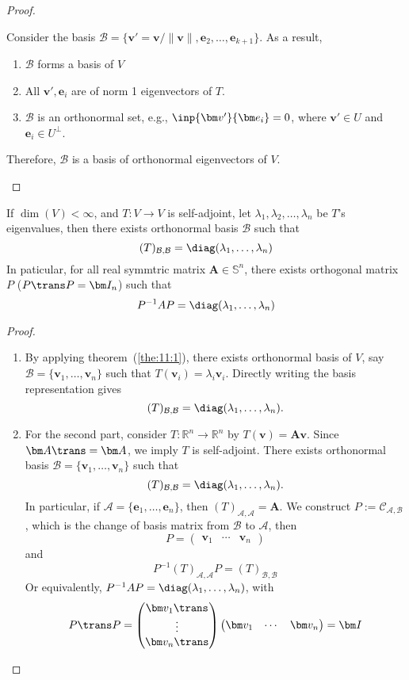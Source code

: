 \begin{proof}
\begin{itemize}
Consider the basis $\mathcal{B}=\{\bm v'=\bm v/\|\bm v\|,\bm e_2,\dots,\bm e_{k+1}\}$. As a result,
\begin{enumerate}
\item
$\mathcal{B}$ forms a basis of $V$
\item
All $\bm v',\bm e_i$ are of norm 1 eigenvectors of $T$.
\item
$\mathcal{B}$ is an orthonormal set, e.g., $\inp{\bm v'}{\bm e_i}=0$, where $\bm v'\in U$ and $\bm e_i\in U^\perp$.
\end{enumerate}
Therefore, $\mathcal{B}$ is a basis of orthonormal eigenvectors of $V$.
\end{itemize}
\end{proof}

\begin{corollary}
If $\dim(V)<\infty$, and $T:V\to V$ is self-adjoint, let $\lambda_1, \lambda_2,\dots,\lambda_n$ be $T$'s eigenvalues, then there exists orthonormal basis $\mathcal{B}$ such that
\[
(T)_{\mathcal{B},\mathcal{B}}=\diag(\lambda_1,\dots,\lambda_n)
\]
In paticular, for all real symmtric matrix $\bm A\in\mathbb{S}^n$, there exists orthogonal matrix $P$ ($P\trans P=\bm I_n$) such that
\[
P^{-1}AP=\diag(\lambda_1,\dots,\lambda_n)
\]
\end{corollary}
\begin{proof}
\begin{enumerate}
\item
By applying theorem~(\ref{the:11:1}), there exists orthonormal basis of $V$, say $\mathcal{B}=\{\bm v_1,\dots,\bm v_n\}$ such that $T(\bm v_i)=\lambda_i\bm v_i$. Directly writing the basis representation gives
\[
(T)_{\mathcal{B},\mathcal{B}}=\diag(\lambda_1,\dots,\lambda_n).
\]
\item
For the second part, consider $T:\mathbb{R}^n\to\mathbb{R}^n$ by $T(\bm v)=\bm A\bm v$.
Since $\bm A\trans=\bm A$, we imply $T$ is self-adjoint.
There exists orthonormal basis $\mathcal{B}=\{\bm v_1,\dots,\bm v_n\}$ such that
\[
(T)_{\mathcal{B},\mathcal{B}}=\diag(\lambda_1,\dots,\lambda_n).
\]
In particular, if $\mathcal{A}=\{\bm e_1,\dots,\bm e_n\}$, then $(T)_{\mathcal{A},\mathcal{A}}=\bm A$.
We construct $P:=\mathcal{C}_{\mathcal{A},\mathcal{B}}$, which is the change of basis matrix from $\mathcal{B}$ to $\mathcal{A}$, then
\[
P=\begin{pmatrix}
\bm v_1&\cdots&\bm v_n
\end{pmatrix}
\]
and 
\[
P^{-1}(T)_{\mathcal{A},\mathcal{A}}P=(T)_{\mathcal{B},\mathcal{B}}
\]
Or equivalently, $P^{-1}AP=\diag(\lambda_1,\dots,\lambda_n)$, with 
\[
P\trans P=\begin{pmatrix}
\bm v_1\trans\\\vdots\\\bm v_n\trans
\end{pmatrix}\begin{pmatrix}
\bm v_1&\cdots&\bm v_n
\end{pmatrix}=\bm I
\]
\end{enumerate}
\end{proof}
